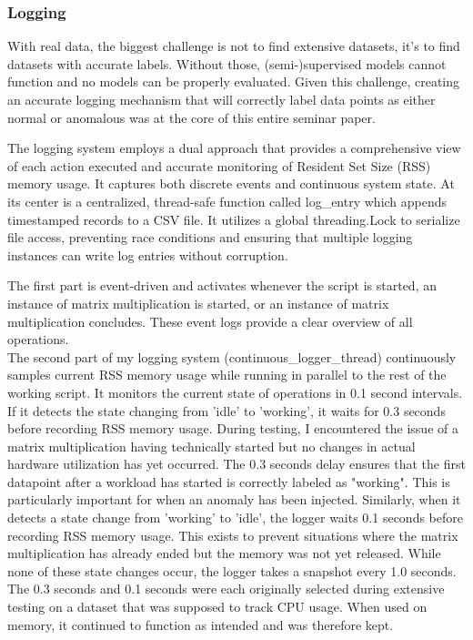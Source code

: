 \documentclass[12pt,oneside]{article}
\begin{document}
\subsubsection{Logging}

With real data, the biggest challenge is not to find extensive datasets, it's to find datasets with accurate labels. Without those, (semi-)supervised models cannot function and no models can be properly evaluated. Given this challenge, creating an accurate logging mechanism that will correctly label data points as either normal or anomalous was at the core of this entire seminar paper. \par
The logging system employs a dual approach that provides a comprehensive view of each action executed and accurate monitoring of Resident Set Size (RSS) memory usage. It captures both discrete events and continuous system state. At its center is a centralized, thread-safe function called log\_entry which appends timestamped records to a CSV file. It utilizes a global threading.Lock to serialize file access, preventing race conditions and ensuring that multiple logging instances can write log entries without corruption. \par
The first part is event-driven and activates whenever the script is started, an instance of matrix multiplication is started, or an instance of matrix multiplication concludes. These event logs provide a clear overview of all operations. \\
The second part of my logging system (continuous\_logger\_thread) continuously samples current RSS memory usage while running in parallel to the rest of the working script. It monitors the current state of operations in 0.1 second intervals. If it detects the state changing from 'idle' to 'working', it waits for 0.3 seconds before recording RSS memory usage. During testing, I encountered the issue of a matrix multiplication having technically started but no changes in actual hardware utilization has yet occurred. The 0.3 seconds delay ensures that the first datapoint after a workload has started is correctly labeled as "working". This is particularly important for when an anomaly has been injected. Similarly, when it detects a state change from 'working' to 'idle', the logger waits 0.1 seconds before recording RSS memory usage. This exists to prevent situations where the matrix multiplication has already ended but the memory was not yet released. While none of these state changes occur, the logger takes a snapshot every 1.0 seconds. The 0.3 seconds and 0.1 seconds were each originally selected during extensive testing on a dataset that was supposed to track CPU usage. When used on memory, it continued to function as intended and was therefore kept.
\end{document}
